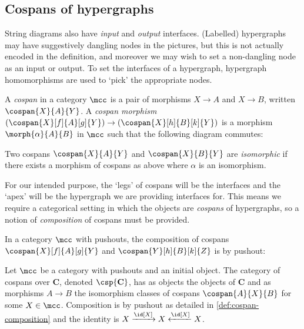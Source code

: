 \subsection{Cospans of hypergraphs}

String diagrams also have \emph{input} and \emph{output} interfaces.
(Labelled) hypergraphs may have suggestively dangling nodes in the pictures,
but this is not actually encoded in the definition, and moreover we may wish to
set a non-dangling node as an input or output.
To set the interfaces of a hypergraph, hypergraph homomorphisms are used
to `pick' the appropriate nodes.

\begin{definition}[Cospan]
    A \emph{cospan} in a category \(\mcc\) is a pair of morphisms \(X \to A\)
    and \(X \to B\), written \(\cospan{X}{A}{Y}\).
    A \emph{cospan morphism} \(
    (\cospan{X}[f]{A}[g]{Y}) \to (\cospan{X}[h]{B}[k]{Y})
    \) is a morphism \(\morph{\alpha}{A}{B}\) in \(\mcc\)
    such that the following diagram commutes:
    \begin{center}
        
    \end{center}
    Two cospans \(\cospan{X}{A}{Y}\) and \(\cospan{X}{B}{Y}\) are
    \emph{isomorphic} if there exists a morphism of cospans as above where
    \(\alpha\) is an isomorphism.
\end{definition}

For our intended purpose, the `legs' of cospans will be the interfaces and the
`apex' will be the hypergraph we are providing interfaces for.
This means we require a categorical setting in which the objects are
\emph{cospans} of hypergraphs, so a notion of \emph{composition} of cospans
must be provided.

\begin{definition}
    \label{def:cospan-composition}
    In a category \(\mcc\) with pushouts, the composition of cospans
    \(\cospan{X}[f]{A}[g]{Y}\) and \(\cospan{Y}[h]{B}[k]{Z}\) is by pushout:
    \begin{center}
        
    \end{center}
\end{definition}

\begin{definition}
    Let \(\mcc\) be a category with pushouts and an initial object.
    The category of cospans over \(\mathbf{C}\), denoted \(\csp{\mathbf{C}}\),
    has as objects the objects of \(\mathbf{C}\) and as morphisms \(A \to B\)
    the isomorphism classes of cospans \(\cospan{A}{X}{B}\) for some
    \(X \in \mcc\).
    Composition is by pushout as detailed in \cref{def:cospan-composition} and
    the identity is \(X \xrightarrow{\id[X]} X \xleftarrow{\id[X]} X\).
\end{definition}

